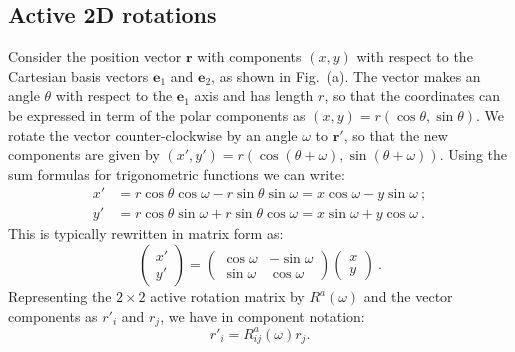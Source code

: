 \subsection{Active 2D rotations}
Consider the position vector $\mathbf{r}$ with components $(x,y)$ with respect to the Cartesian basis vectors $\mathbf{e}_1$ and $\mathbf{e}_2$, as shown in Fig.~(a).  The vector makes an angle $\theta$ with respect to the $\mathbf{e}_1$ axis and has length $r$, so that the coordinates can be expressed in term of the polar components as $(x,y) = r(\cos\theta,\sin\theta)$.  We rotate the vector counter-clockwise by an angle $\omega$ to $\mathbf{r}'$, so that the new components are given by $(x',y') = r\left(\cos(\theta+\omega),\sin(\theta+\omega)\right)$.  Using the sum formulas for trigonometric functions we can write:
\begin{align*}
	x' &= r\cos\theta\cos\omega - r\sin\theta\sin\omega = x\cos\omega - y\sin\omega\ ;\\
	y' &= r\cos\theta\sin\omega + r\sin\theta\cos\omega = x\sin\omega + y\cos\omega\ .	
\end{align*}
This is typically rewritten in matrix form as:
\[
	\left(\begin{array}{c} x' \\ y'\end{array}\right) = 
	\left(\begin{array}{cc} \cos\omega & -\sin\omega\\ \sin\omega & \cos\omega\end{array}\right)
	\left(\begin{array}{c} x \\ y\end{array}\right) \ .	
\]
Representing the $2\times 2$ active rotation matrix by $R^a(\omega)$ and the vector components as $r'_i$ and $r_j$, we have in component notation:
\begin{equation}
	r'_i = R^a_{ij}(\omega) r_j.
\end{equation}


